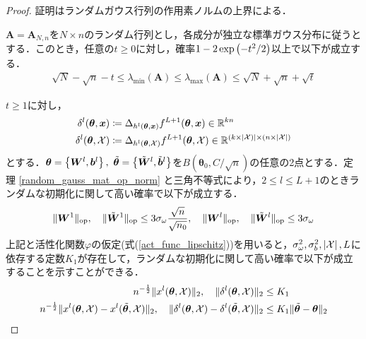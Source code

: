 \begin{proof}
    証明はランダムガウス行列の作用素ノルムの上界による．
    \begin{thm}
        \label{random_gauss_mat_op_norm}
        $\bm{A} = \bm{A}_{N, n}$を$N \times n$のランダム行列とし，各成分が独立な標準ガウス分布に従うとする．このとき，任意の$t \geq 0$に対し，確率$1 - 2\exp\left(-t^2/2\right)$以上で以下が成立する．
        \begin{align}
            \sqrt{N} - \sqrt{n} - t \leq \lambda_{\min}(\bm{A}) \leq \lambda_{\max}(\bm{A}) \leq \sqrt{N} + \sqrt{n} + \sqrt{t}
        \end{align}
    \end{thm}
    $t \geq 1$に対し，
    \begin{align}
        \delta^l (\bm{\theta}, \bm{x}) &\coloneqq \Delta_{h^l(\bm{\theta}, \bm{x})}f^{L+1}(\bm{\theta}, \bm{x}) \in \mathbb{R}^{kn} \\
        \delta^l (\bm{\theta}, \mathcal{X}) &\coloneqq \Delta_{h^l(\bm{\theta}, \mathcal{X})}f^{L+1}(\bm{\theta}, \mathcal{X}) \in \mathbb{R}^{{(k \times \left|\mathcal{X})\right|} \times (n \times \left|\mathcal{X}\right|)}
    \end{align}
    とする．$\bm{\theta} = \left\{\bm{W}^l, \bm{b}^l\right\}, \ \tilde{\bm{\theta}} = \left\{\tilde{\bm{W}}^l, \tilde{\bm{b}}^l\right\}$を$B(\bm{\theta}_0, C/\sqrt{n})$の任意の2点とする．定理 \ref{random_gauss_mat_op_norm} と三角不等式により，$2 \leq l \leq L+1$のときランダムな初期化に関して高い確率で以下が成立する．
    \begin{align}
        \|\bm{W}^1\|_{\mathrm{op}}, \quad \|\tilde{\bm{W}}^1\|_{\mathrm{op}} \leq 3\sigma_{\omega}\dfrac{\sqrt{n}}{\sqrt{n_0}}, \quad \|\bm{W}^l\|_{\mathrm{op}}, \quad \|\tilde{\bm{W}}^l\|_{\mathrm{op}} \leq 3\sigma_{\omega}
    \end{align}
    上記と活性化関数$\varphi$の仮定(式(\ref{act_func_lipschitz}))を用いると，$\sigma_{\omega}^2, \sigma_{b}^2, \left|\mathcal{X}\right|, L$に依存する定数$K_1$が存在して，ランダムな初期化に関して高い確率で以下が成立することを示すことができる．
    \begin{align}
        n^{-\frac{1}{2}}\norm{x^l(\bm{\theta}, \mathcal{X})}_2, \quad \norm{\delta^l (\bm{\theta}, \mathcal{X})}_2 &\leq K_1 \\
        n^{-\frac{1}{2}}\norm{x^l(\bm{\theta}, \mathcal{X}) - x^l(\tilde{\bm{\theta}}, \mathcal{X})}_2, \quad \norm{\delta^l (\bm{\theta}, \mathcal{X}) - \delta^l (\tilde{\bm{\theta}}, \mathcal{X})}_2 &\leq K_1\norm{\tilde{\bm{\theta}} - \bm{\theta}}_2

\end{align}
\end{proof}
